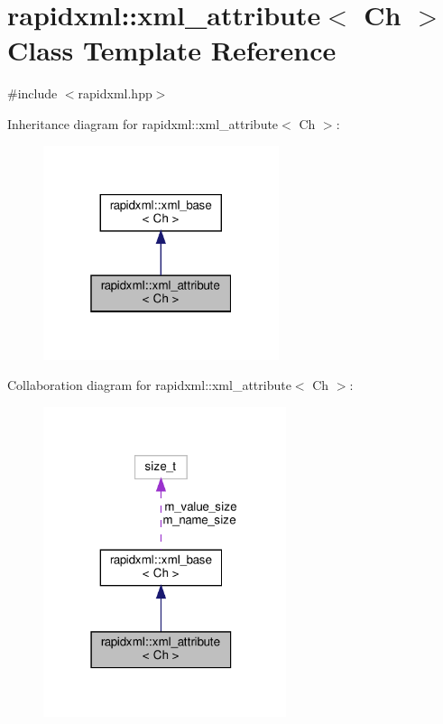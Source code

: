 \hypertarget{classrapidxml_1_1xml__attribute}{}\section{rapidxml\+:\+:xml\+\_\+attribute$<$ Ch $>$ Class Template Reference}
\label{classrapidxml_1_1xml__attribute}


{\ttfamily \#include $<$rapidxml.\+hpp$>$}



Inheritance diagram for rapidxml\+:\+:xml\+\_\+attribute$<$ Ch $>$\+:
\nopagebreak
\begin{figure}[H]
\begin{center}
\leavevmode
\includegraphics[width=196pt]{classrapidxml_1_1xml__attribute__inherit__graph}
\end{center}
\end{figure}


Collaboration diagram for rapidxml\+:\+:xml\+\_\+attribute$<$ Ch $>$\+:
\nopagebreak
\begin{figure}[H]
\begin{center}
\leavevmode
\includegraphics[width=202pt]{classrapidxml_1_1xml__attribute__coll__graph}
\end{center}
\end{figure}
